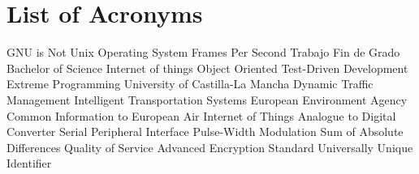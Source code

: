 \chapter{List of Acronyms} %

{\small
\begin{acronym}[XXXXXXXX]
	     	{\acs{GNU} is Not Unix}
			{Operating System}
			{Frames Per Second}
			{Trabajo Fin de Grado}
			{Bachelor of Science}
			{Internet of things}
			{Object Oriented}
			{Test-Driven Development}
			{Extreme Programming}
			{University of Castilla-La Mancha}
			{Dynamic Traffic Management}
			{Intelligent Transportation Systems}
			{European Environment Agency}
		{Common Information to European Air}
	 		{Internet of Things}
			{Analogue to Digital Converter}
			{Serial Peripheral Interface}
			{Pulse-Width Modulation}
			{Sum of Absolute Differences}
			{Quality of Service}
			{Advanced Encryption Standard}
			{Universally Unique Identifier}
\end{acronym}
}




